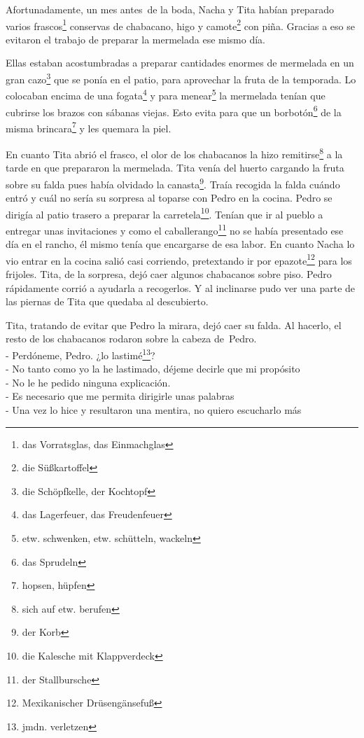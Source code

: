 Afortunadamente, un mes antes~de la boda, Nacha y Tita habían
preparado varios frascos\footnote{das Vorratsglas, das Einmachglas}
conservas de chabacano, higo y camote\footnote{die Süßkartoffel} con piña.
Gracias a eso se evitaron el trabajo de preparar la mermelada ese mismo
día.

Ellas estaban acostumbradas a preparar cantidades enormes de mermelada
en un gran cazo\footnote{die Schöpfkelle, der Kochtopf} que se ponía
en el patio, para aprovechar la fruta de la temporada. Lo colocaban
encima de una fogata\footnote{das Lagerfeuer, das Freudenfeuer} y
para menear\footnote{etw. schwenken, etw. schütteln, wackeln}
la mermelada tenían que cubrirse los brazos con sábanas viejas. Esto
evita para que un borbotón\footnote{das Sprudeln} de la misma brincara\footnote{hopsen, hüpfen} y les quemara la piel.

En cuanto Tita abrió el frasco, el olor de los chabacanos la hizo remitirse\footnote{sich auf etw. berufen} a la tarde en
que prepararon la mermelada. Tita venía del huerto cargando la fruta
sobre su falda pues había olvidado la canasta\footnote{der Korb}.
Traía recogida la falda cuándo entró y cuál no sería su sorpresa al
toparse con Pedro en la cocina. Pedro se dirigía al patio trasero a
preparar la carretela\footnote{die Kalesche mit Klappverdeck}.
Tenían que ir al pueblo a entregar unas invitaciones y como el caballerango\footnote{der Stallbursche} no se había
presentado ese día en el rancho, él mismo tenía que encargarse de esa
labor. En cuanto Nacha lo vio entrar en la cocina salió casi corriendo,
pretextando ir por epazote\footnote{Mexikanischer Drüsengänsefuß}
para los frijoles. Tita, de la sorpresa, dejó caer algunos chabacanos
sobre piso. Pedro rápidamente corrió a ayudarla a recogerlos. Y al
inclinarse pudo ver una parte de las piernas de Tita que quedaba al
descubierto.

Tita, tratando de evitar que Pedro la mirara, dejó caer su falda. Al
hacerlo, el resto de los chabacanos rodaron sobre la cabeza de~Pedro.
\\- Perdóneme, Pedro. ¿lo lastimé\footnote{jmdn. verletzen}? %
\\- No tanto como yo la he lastimado, déjeme decirle que mi propósito \ndots %
\\- No le he pedido ninguna explicación. %
\\- Es necesario que me permita dirigirle unas palabras \ndots %
\\- Una vez lo hice y resultaron una mentira, no quiero escucharlo más %
\ndots\\

